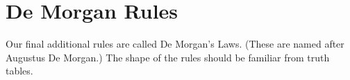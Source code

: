
\begin{highlighted}\begin{fitchproof}
\end{fitchproof}\end{highlighted}

%
\section{De Morgan Rules}
Our final additional rules are called De Morgan's Laws. (These are named after Augustus De Morgan.) The shape of the rules should be familiar from truth tables.

